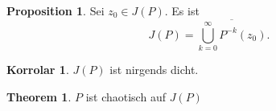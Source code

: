 \documentclass{beamer}
\theoremstyle{definition}
\newcounter{foo}
\newtheorem{thm}[foo]{Theorem}
\newtheorem{kor}[foo]{Korrolar}
\newtheorem{prop}[foo]{Proposition}
\begin{document}
\begin{frame}
\begin{prop}
Sei $z_0 \in J(P)$. Es ist
\[
J(P)=\overline{\bigcup_{k=0}^\infty P^{-k}(z_0)}.
\]
\end{prop}
\begin{kor}
$J(P)$ ist nirgends dicht. 
\end{kor}

\begin{thm}
$P$ ist chaotisch auf $J(P)$
\end{thm}
\end{frame}
\end{document}
